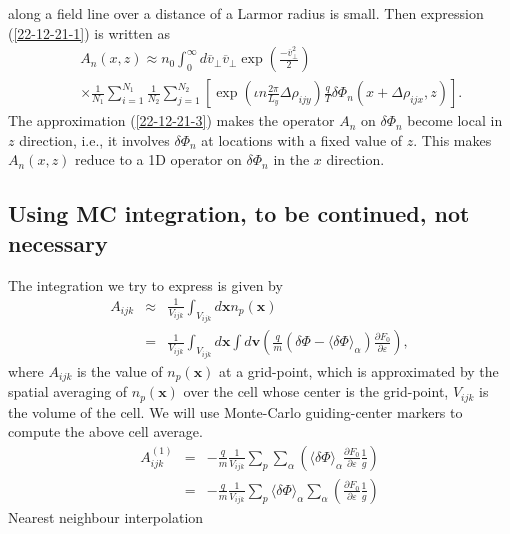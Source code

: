 \documentclass{llncs}
\begin{document}
along a field line over a distance of a Larmor radius is small. Then
expression (\ref{22-12-21-1}) is written as
\begin{eqnarray}
  &  & A_n (x, z) \approx n_0  \int_0^{\infty} d \overline{v}_{\perp}
  \overline{v}_{\perp} \exp \left( \frac{- \overline{v}^2_{\perp}}{2} \right)
  \nonumber\\
  &  & \times \frac{1}{N_1} \sum_{i = 1}^{N_1} \frac{1}{N_2}  \sum_{j =
  1}^{N_2} \left[ \exp \left( \iota n \frac{2 \pi}{L_y} \Delta \rho_{i j y}
  \right) \frac{q}{T} \delta \Phi_n (x + \Delta \rho_{i j x}, z) \right] . 
\end{eqnarray}
The approximation (\ref{22-12-21-3}) makes the operator $A_n$ on $\delta
\Phi_n$ become local in $z$ direction, i.e., it involves $\delta \Phi_n$ at
locations with a fixed value of $z$. This makes $A_n (x, z)$ reduce to a 1D
operator on $\delta \Phi_n$ in the $x$ direction.

\subsection{Using MC integration, to be continued, not necessary}

The integration we try to express is given by
\begin{eqnarray}
  A_{i j k} & \approx & \frac{1}{V_{i j k}} \int_{V_{i j k}} d\mathbf{x}n_p
  (\mathbf{x}) \nonumber\\
  & = & \frac{1}{V_{i j k}} \int_{V_{i j k}} d\mathbf{x} \int d\mathbf{v}
  \left( \frac{q}{m} (\delta \Phi - \langle \delta \Phi \rangle_{\alpha})
  \frac{\partial F_0}{\partial \varepsilon} \right), 
\end{eqnarray}
where $A_{i j k}$ is the value of $n_p (\mathbf{x})$ at a grid-point, which is
approximated by the spatial averaging of $n_p (\mathbf{x})$ over the cell
whose center is the grid-point, $V_{i j k}$ is the volume of the cell. We will
use Monte-Carlo guiding-center markers to compute the above cell average.
\begin{eqnarray*}
  A_{i j k}^{(1)} & = & - \frac{q}{m} \frac{1}{V_{i j k}} \sum_p \sum_{\alpha}
  \left( \langle \delta \Phi \rangle_{\alpha} \frac{\partial F_0}{\partial
  \varepsilon} \frac{1}{g} \right)\\
  & = & - \frac{q}{m} \frac{1}{V_{i j k} } \sum_p \langle \delta \Phi
  \rangle_{\alpha} \sum_{\alpha} \left( \frac{\partial F_0}{\partial
  \varepsilon} \frac{1}{g} \right)
\end{eqnarray*}
Nearest neighbour interpolation
\end{document}
